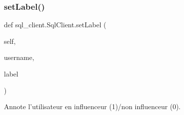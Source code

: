 \subsubsection{\texorpdfstring{set\+Label()}{setLabel()}}
{\footnotesize\ttfamily def sql\+\_\+client.\+Sql\+Client.\+set\+Label (\begin{DoxyParamCaption}\item[{}]{self,  }\item[{}]{username,  }\item[{}]{label }\end{DoxyParamCaption})}

\begin{DoxyVerb}Annote l'utilisateur en influenceur (1)/non influenceur (0).
\end{DoxyVerb}

